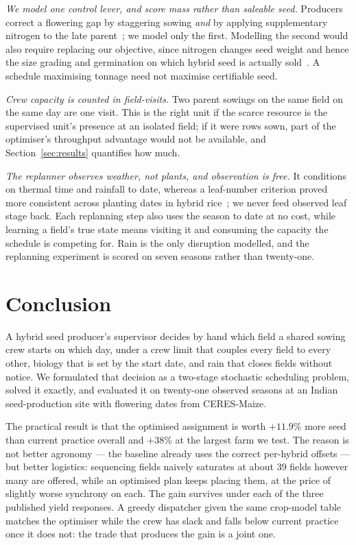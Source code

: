 \documentclass[10pt,twocolumn]{article}
\begin{document}
\emph{We model one control lever, and score mass rather than saleable seed.}
Producers correct a flowering gap by staggering sowing \emph{and} by applying
supplementary nitrogen to the late parent~\cite{priyanka2017,patil2026,%
asefa2024}; we model only the first. Modelling the second would also require
replacing our objective, since nitrogen changes seed weight and hence the
size grading and germination on which hybrid seed is actually
sold~\cite{marahatta2025}. A schedule maximising tonnage need not maximise
certifiable seed.

\emph{Crew capacity is counted in field-visits.} Two parent sowings on the
same field on the same day are one visit. This is the right unit if the
scarce resource is the supervised unit's presence at an isolated field; if
it were rows sown, part of the optimiser's throughput advantage would not
be available, and Section~\ref{sec:results} quantifies how much.

\emph{The replanner observes weather, not plants, and observation is free.}
It conditions on thermal time and rainfall to date, whereas a leaf-number
criterion proved more consistent across planting dates in hybrid
rice~\cite{varma2018}; we never feed observed leaf stage back. Each
replanning step also uses the season to date at no cost, while learning a
field's true state means visiting it and consuming the capacity the
schedule is competing for. Rain is the only disruption modelled, and the
replanning experiment is scored on seven seasons rather than
twenty-one.

\section{Conclusion}

A hybrid seed producer's supervisor decides by hand which field a
shared sowing crew starts on which day, under a crew limit that couples
every field to every other, biology that is set by the start date, and
rain that closes fields without notice. We formulated that decision as
a two-stage stochastic scheduling problem, solved it exactly, and
evaluated it on twenty-one observed seasons at an Indian
seed-production site with flowering dates from CERES-Maize.

The practical result is that the optimised assignment is worth
$+11.9$\% more seed than current practice overall and
$+38$\% at the largest farm we test. The reason is not
better agronomy --- the baseline already uses the correct per-hybrid
offsets --- but better logistics: sequencing fields naively saturates
at about 39 fields however many are offered, while an
optimised plan keeps placing them, at the price of slightly worse
synchrony on each. The gain survives under each of the three published
yield responses. A greedy dispatcher given the same crop-model table
matches the optimiser while the crew has slack and falls below current
practice once it does not: the trade that produces the gain is a joint
one.
\end{document}
